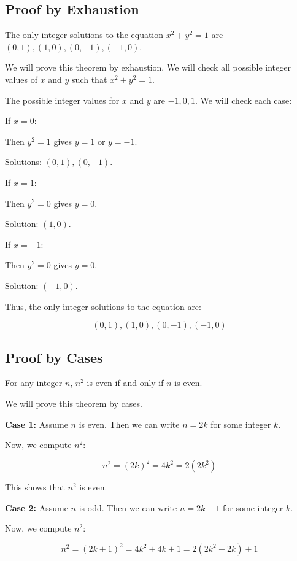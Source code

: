 \subsection{Proof by Exhaustion}

The only integer solutions to the equation \( x^2 + y^2 = 1 \) are \( (0, 1), (1, 0), (0, -1), (-1, 0) \).

We will prove this theorem by exhaustion. We will check all possible integer values of \(x\) and 
\(y\) such that \( x^2 + y^2 = 1 \).

The possible integer values for \(x\) and \(y\) are \( -1, 0, 1 \). We will check each case:

If \( x = 0 \):

Then \( y^2 = 1 \) gives \( y = 1 \) or \( y = -1 \).

Solutions: \( (0, 1), (0, -1) \).

If \( x = 1 \):

Then \( y^2 = 0 \) gives \( y = 0 \).

Solution: \( (1, 0) \).

If \( x = -1 \):

Then \( y^2 = 0 \) gives \( y = 0 \).

Solution: \( (-1, 0) \).

Thus, the only integer solutions to the equation are:
	
\[
	(0, 1), (1, 0), (0, -1), (-1, 0)
\]

\QED

\subsection{Proof by Cases}

For any integer \(n\), \( n^2 \) is even if and only if \(n\) is even.

We will prove this theorem by cases.

\textbf{Case 1:} Assume \(n\) is even. Then we can write \( n = 2k \) for some integer \(k\).

Now, we compute \( n^2 \):

\[
	n^2 = {(2k)}^2 = 4k^2 = 2(2k^2)
\]

This shows that \( n^2 \) is even.

\textbf{Case 2:} Assume \(n\) is odd. Then we can write \( n = 2k + 1 \) for some integer \(k\).

Now, we compute \( n^2 \):

\[
	n^2 = {(2k + 1)}^2 = 4k^2 + 4k + 1 = 2(2k^2 + 2k) + 1
\]

